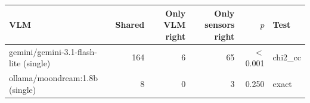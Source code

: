 \begin{tabular}{lrrrrl}
\toprule
VLM & Shared & Only VLM right & Only sensors right & $p$ & Test \\
\midrule
gemini/gemini-3.1-flash-lite (single) & 164 & 6 & 65 & $<$0.001 & chi2\_cc \\
ollama/moondream:1.8b (single) & 8 & 0 & 3 & 0.250 & exact \\
\bottomrule
\end{tabular}
